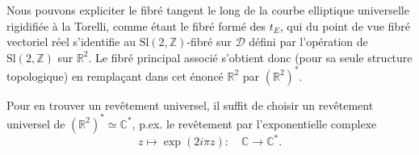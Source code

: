 
Nous pouvons expliciter le fibré tangent le long   de la courbe elliptique universelle rigidifiée à la Torelli, comme étant le fibré formé des $t_E$, qui du point de vue fibré vectoriel réel s'identifie au  $\mathrm{Sl}(2,\mathbb Z)$-fibré sur $\mathcal D$ défini par l'opération  de $\mathrm{Sl}(2,\mathbb Z)$ sur $\mathbb R^2$. Le fibré principal associé  s'obtient donc (pour sa seule structure topologique) en remplaçant dans cet énoncé $\mathbb R^2$ par $(\mathbb R^2)^*$.

Pour en trouver un revêtement universel, il suffit de choisir un revêtement universel de $(\mathbb R^2)^*\simeq\mathbb C^*$, p.ex. le revêtement par l'exponentielle complexe
\[
z\longmapsto\exp(2i\pi z):\quad
\mathbb C\longrightarrow\mathbb C^*.
\]
